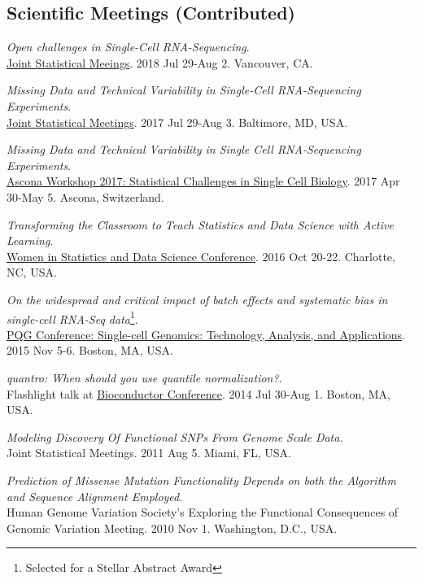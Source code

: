 \documentclass[10pt]{article}
\begin{document}
\subsection*{Scientific Meetings (Contributed)}

\item 
{\it Open challenges in Single-Cell RNA-Sequencing}. \\
\href{https://ww2.amstat.org/meetings/jsm/2018/onlineprogram/ActivityDetails.cfm?SessionID=215111}{Joint Statistical Meeings}. 2018 Jul 29-Aug 2. Vancouver, CA.
\item 
{\it Missing Data and Technical Variability in Single-Cell RNA-Sequencing Experiments}. \\
\href{https://ww2.amstat.org/meetings/jsm/2017/}{Joint Statistical Meetings}. 2017 Jul 29-Aug 3. Baltimore, MD, USA.
\item 
{\it Missing Data and Technical Variability in Single Cell RNA-Sequencing Experiments}. \\
\href{https://www.bsse.ethz.ch/cbg/cbg-news/ascona-2017.html}{Ascona Workshop 2017: Statistical Challenges in Single Cell Biology}. 2017 Apr 30-May 5. Ascona, Switzerland.
\item 
{\it Transforming the Classroom to Teach Statistics and Data Science with Active Learning}. \\ 
\href{http://www.amstat.org/meetings/wsds/2016/}{Women in Statistics and Data Science Conference}. 2016 Oct 20-22. Charlotte, NC, USA.
\item
{\it On the widespread and critical impact of batch effects and systematic bias in single-cell RNA-Seq data}\footnote{Selected for a Stellar Abstract Award}. \\ 
 \href{https://www.hsph.harvard.edu/2015-pqg-conference/}{PQG Conference: Single-cell Genomics: Technology, Analysis, and Applications}. 2015 Nov 5-6. Boston, MA, USA.
\item 
{\it quantro: When should you use quantile normalization?}. \\ 
Flashlight talk at \href{https://www.bioconductor.org/help/course-materials/2014/BioC2014/}{Bioconductor Conference}. 2014 Jul 30-Aug 1. Boston, MA, USA.
\item 
{\it Modeling Discovery Of Functional SNPs From Genome Scale Data}. \\
Joint Statistical Meetings. 2011 Aug 5. Miami, FL, USA.
\item 
{\it Prediction of Missense Mutation Functionality Depends on both the Algorithm and Sequence Alignment Employed}. \\
Human Genome Variation Society's Exploring the Functional Consequences of Genomic Variation Meeting. 2010 Nov 1. Washington, D.C., USA.
\end{document}
